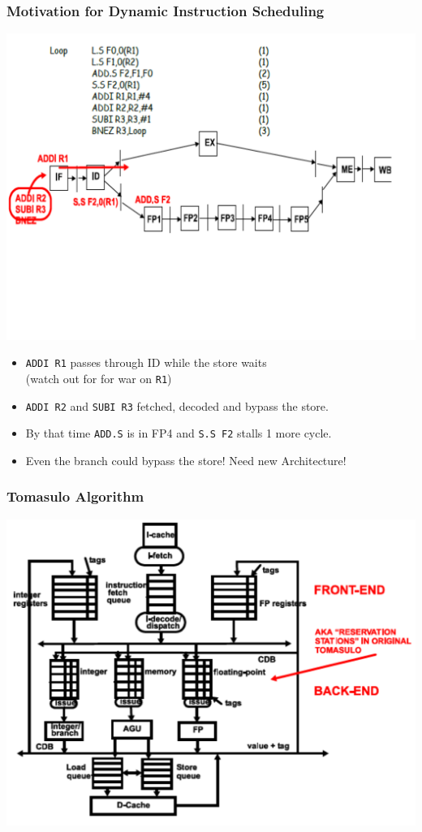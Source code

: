 \documentclass{beamer}
\newcommand{\emp}[1]{\textcolor{DikuRed}{ #1}}
\newcommand{\emphh}[1]{\textcolor{CosGreen}{ #1}}
\begin{document}
\begin{frame}[fragile,t]
\frametitle{Motivation for Dynamic Instruction Scheduling}

\includegraphics[width=55ex]{FigsOoOProc/Motivation.pdf}
\vspace{-13ex}
\pause

\begin{itemize}
    \item \emp{\tt ADDI R1} passes through ID while the store waits\\
            (watch out for for {\sc war} on {\tt R1})\medskip
 
    \item \emp{\tt ADDI R2} and  \emp{\tt SUBI R3} fetched, decoded and bypass the store.\medskip

    \item By that time \emp{\tt ADD.S} is in FP4 and \emp{\tt S.S F2} stalls 1 more cycle.\medskip

    \item \emphh{Even the branch could bypass the store! Need new Architecture!}
\end{itemize}
\end{frame}


\begin{frame}[fragile,t]
\frametitle{Tomasulo Algorithm}

\includegraphics[width=63ex]{FigsOoOProc/Tomasulo.pdf}

\end{frame}
\end{document}

